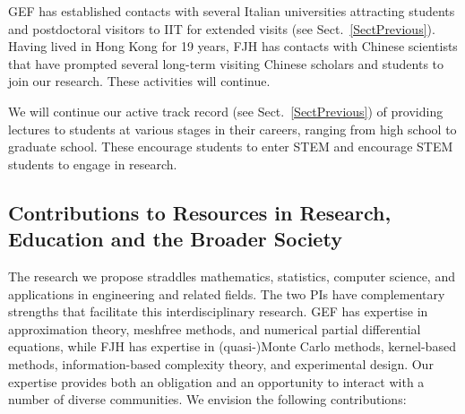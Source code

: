 \documentclass[11pt]{NSFamsart}
\begin{document}
\begin{description}[leftmargin=0ex]
\item[Supervising Visitors]
GEF has established contacts with several Italian universities attracting students and postdoctoral visitors to IIT for extended visits (see Sect.~\ref{SectPrevious}). Having lived in Hong Kong for 19 years, FJH has contacts with Chinese scientists that have prompted several long-term visiting Chinese scholars and students to join our research.  These activities will continue.

\item[Giving Short Courses and Invited Lectures]
We will continue our active track record (see Sect.~\ref{SectPrevious}) of providing lectures to students at various stages in their careers, ranging from high school to graduate school. These encourage students to enter STEM and encourage STEM students to engage in research.

\end{description}

\subsection{Contributions to Resources in Research, Education and the Broader Society}

The research we propose straddles mathematics, statistics, computer science, and applications in engineering and related fields.  The two PIs have complementary strengths that facilitate this interdisciplinary research.  GEF has expertise in approximation theory, meshfree methods, and numerical partial differential equations, while FJH has expertise in (quasi-)Monte Carlo methods, kernel-based methods, information-based complexity theory, and experimental design. Our expertise provides both an obligation and an opportunity to interact with a number of diverse communities. We envision the following contributions:
\end{document}
